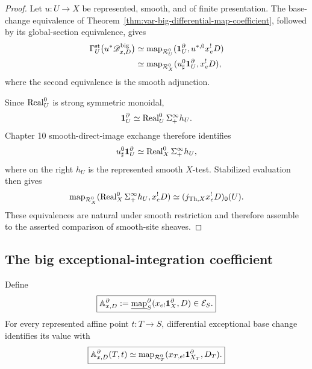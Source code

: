 \begin{proof}
Let \(u:U\to X\) be represented, smooth, and of finite presentation. The base-change equivalence of Theorem~\ref{thm:var-big-differential-map-coefficient}, followed by its global-section equivalence, gives
\[
\begin{aligned}
    \Gamma_U^{\mathrm{st}}
    \bigl(u^*\mathscr D_{x,D}^{\mathrm{big}}\bigr)
    &\simeq
    \operatorname{map}_{\mathcal R_U^0}
    (\mathbf 1_U^\partial,u^{*,0}x_e^!D)
    \\
    &\simeq
    \operatorname{map}_{\mathcal R_X^0}
    (u_\sharp^0\mathbf 1_U^\partial,x_e^!D),
\end{aligned}
\]
where the second equivalence is the smooth adjunction.

Since \(\operatorname{Real}_U^0\) is strong symmetric monoidal,
\[
    \mathbf 1_U^\partial
    \simeq
    \operatorname{Real}_U^0\Sigma_+^\infty h_U.
\]
Chapter 10 smooth-direct-image exchange therefore identifies
\[
    u_\sharp^0\mathbf 1_U^\partial
    \simeq
    \operatorname{Real}_X^0\Sigma_+^\infty h_U,
\]
where on the right \(h_U\) is the represented smooth \(X\)-test. Stabilized evaluation then gives
\[
    \operatorname{map}_{\mathcal R_X^0}
    (\operatorname{Real}_X^0\Sigma_+^\infty h_U,x_e^!D)
    \simeq
    (j_{\mathrm{Th},X}x_e^!D)_0(U).
\]
These equivalences are natural under smooth restriction and therefore assemble to the asserted comparison of smooth-site sheaves.
\end{proof}

\subsection{The big exceptional-integration coefficient}

\begin{definition}
\label{def:var-big-action-coefficient}
Define
\[
    \boxed{
    \mathbb A^\partial_{x,D}
    :=
    \underline{\operatorname{map}}^{\partial}_{S}
    (x_{e!}\mathbf 1_X^\partial,D)
    \in
    \mathcal E_S.
    }
\]
For every represented affine point \(t:T\to S\), differential exceptional base change identifies its value with
\[
    \boxed{
    \mathbb A^\partial_{x,D}(T,t)
    \simeq
    \operatorname{map}_{\mathcal R_T^0}
    (x_{T,e!}\mathbf 1_{X_T}^\partial,D_T).
    }
\]
\end{definition}

